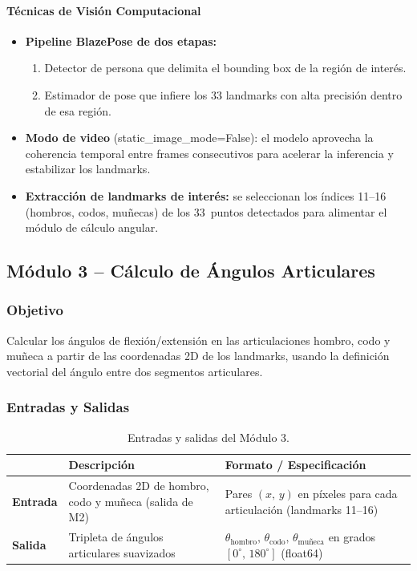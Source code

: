 \paragraph{Técnicas de Visión Computacional}
\begin{itemize}[leftmargin=1.5em]
  \item \textbf{Pipeline BlazePose de dos etapas:}
        \begin{enumerate}[leftmargin=2em]
          \item Detector de persona que delimita el bounding
                box de la región de interés.
          \item Estimador de pose que infiere los 33 landmarks con
                alta precisión dentro de esa región.
        \end{enumerate}
  \item \textbf{Modo de video} (static\_image\_mode=False):
        el modelo aprovecha la coherencia temporal entre frames
        consecutivos para acelerar la inferencia y estabilizar los
        landmarks.
  \item \textbf{Extracción de landmarks de interés:} se seleccionan los
        índices 11–16 (hombros, codos, muñecas) de los 33~puntos
        detectados para alimentar el módulo de cálculo angular.
\end{itemize}

\subsection{Módulo 3 -- Cálculo de Ángulos Articulares}
\subsubsection*{Objetivo}
Calcular los ángulos de flexión/extensión en las articulaciones
hombro, codo y muñeca a partir de las coordenadas 2D de los landmarks,
usando la definición vectorial del ángulo entre dos segmentos
articulares.

\subsubsection*{Entradas y Salidas}

\begin{table}[h!]
\centering
\renewcommand{\arraystretch}{1.3}
\begin{tabularx}{\textwidth}{
    >{\bfseries}p{3cm}
    X
    X
}    
\toprule
&
\textbf{Descripción} &
\textbf{Formato / Especificación} \\
\midrule
Entrada &
  Coordenadas 2D de hombro, codo y muñeca (salida de M2) &
  Pares $(x,\,y)$ en píxeles para cada articulación
  (landmarks 11–16) \\
\midrule
Salida &
  Tripleta de ángulos articulares suavizados &
  $\theta_{\text{hombro}},\,\theta_{\text{codo}},\,
   \theta_{\text{muñeca}}$ en grados $[0^\circ,\,180^\circ]$ (float64) \\
\bottomrule
\end{tabularx}
\caption{Entradas y salidas del Módulo 3.}
\label{tab:m3_io}
\end{table}

